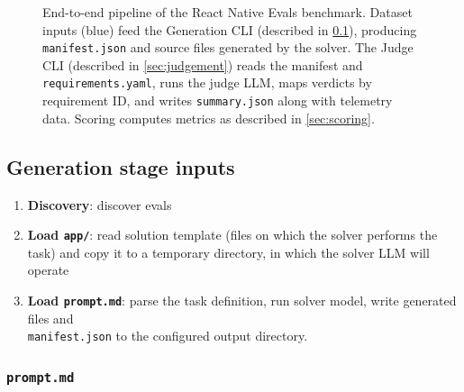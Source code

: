 \documentclass[11pt]{article}
\begin{document}
\begin{figure}[htbp]
\caption{End-to-end pipeline of the React Native Evals benchmark. Dataset inputs (blue) feed the Generation CLI (described in \cref{sec:generation}), producing \texttt{manifest.json} and source files generated by the solver. The Judge CLI (described in \cref{sec:judgement}) reads the manifest and \texttt{requirements.yaml}, runs the judge LLM, maps verdicts by requirement ID, and writes \texttt{summary.json} along with telemetry data. Scoring computes metrics as described in \cref{sec:scoring}.}
\label{fig:pipeline-flow}
\end{figure}

\subsection{Generation stage inputs}
\label{sec:generation}

\begin{enumerate}
  \item \textbf{Discovery}: discover evals
  \item \textbf{Load \texttt{app/}}: read solution template (files on which the solver performs the task) and copy it to a temporary directory, in which the solver LLM will operate
  \item \textbf{Load \texttt{prompt.md}}: parse the task definition, run solver model, write generated files and \\\texttt{manifest.json} to the configured output directory.
\end{enumerate}

\subsubsection{\texttt{prompt.md}}
\end{document}
